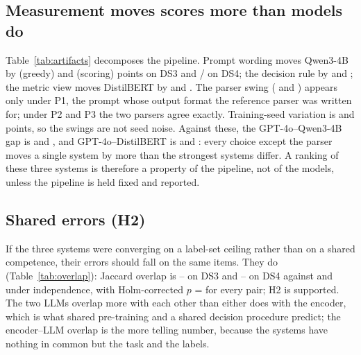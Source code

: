 \documentclass[sigconf,anonymous,review]{acmart}
\newcommand{\fone}{macro-F1\xspace}
\begin{document}
\subsection{Measurement moves scores more than models do}
\begin{table}[t]
\caption{Largest \fone swing produced by each measurement choice for one model on one dataset, next to the model gaps under the pre-registered configuration. Swings above 2 points exceed the pre-declared negligibility band.}
\label{tab:artifacts}
\centering\small

\end{table}
Table~\ref{tab:artifacts} decomposes the pipeline. Prompt wording moves Qwen3-4B by \artPromptGDSthree{} (greedy) and \artPromptSDSthree{} (scoring) points on DS3 and \artPromptGDSfour{}/\artPromptSDSfour{} on DS4; the decision rule by \artRuleDSthree{} and \artRuleDSfour; the metric view moves DistilBERT by \artMetricDSthree{} and \artMetricDSfour. The parser swing (\artParserDSthree{} and \artParserDSfour) appears only under P1, the prompt whose output format the reference parser was written for; under P2 and P3 the two parsers agree exactly. Training-seed variation is \seedSdDSthree{} and \seedSdDSfour{} points, so the swings are not seed noise. Against these, the GPT-4o--Qwen3-4B gap is \gapQfourDSthree{} and \gapQfourDSfour{}, and GPT-4o--DistilBERT is \gapDbDSthree{} and \gapDbDSfour: every choice except the parser moves a single system by more than the strongest systems differ. A ranking of these three systems is therefore a property of the pipeline, not of the models, unless the pipeline is held fixed and reported.

\subsection{Shared errors (H2)}
\begin{table}[t]
\caption{Error overlap between systems (DB = DistilBERT, Q4B = Qwen3-4B): observed Jaccard, permutation null (10{,}000 draws), shared errors observed / expected under independence, and Holm-corrected $p$.}
\label{tab:overlap}
\centering\footnotesize\setlength{\tabcolsep}{3.5pt}

\end{table}
If the three systems were converging on a label-set ceiling rather than on a shared competence, their errors should fall on the same items. They do (Table~\ref{tab:overlap}): Jaccard overlap is \jMinDSthree--\jMaxDSthree{} on DS3 and \jMinDSfour--\jMaxDSfour{} on DS4 against \jNullDSthree{} and \jNullDSfour{} under independence, with Holm-corrected $p$ = \overlapHolmP{} for every pair; H2 is supported. The two LLMs overlap more with each other than either does with the encoder, which is what shared pre-training and a shared decision procedure predict; the encoder--LLM overlap is the more telling number, because the systems have nothing in common but the task and the labels.
\end{document}
